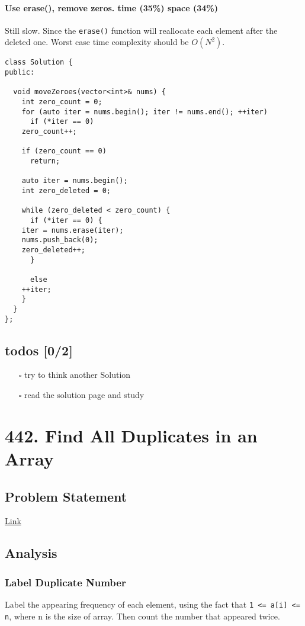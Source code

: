 \documentclass[12pt]{book}
\begin{document}
\subsubsection{Use erase(), remove zeros. time (35\%) space (34\%)}
\label{sec:orgc487c27}
Still slow. Since the \texttt{erase()} function will reallocate each element after the deleted one. Worst case time complexity should be \(O(N^2)\).
\begin{verbatim}
class Solution {
public:

  void moveZeroes(vector<int>& nums) {
    int zero_count = 0;
    for (auto iter = nums.begin(); iter != nums.end(); ++iter)
      if (*iter == 0)
	zero_count++;

    if (zero_count == 0)
      return;

    auto iter = nums.begin();
    int zero_deleted = 0;

    while (zero_deleted < zero_count) {
      if (*iter == 0) {
	iter = nums.erase(iter);
	nums.push_back(0);
	zero_deleted++;
      }

      else
	++iter;       
    }
  }
};
\end{verbatim}
\section{todos [0/2]}
\label{sec:orgc5e291a}
\begin{itemize}
\item[{$\square$}] try to think another Solution
\item[{$\square$}] read the solution page and study
\end{itemize}
\chapter{442. Find All Duplicates in an Array\label{orgb2f1edb}}
\label{sec:orgbff3927}
\section{Problem Statement}
\label{sec:orgc09cc6f}
\href{https://leetcode.com/problems/find-all-duplicates-in-an-array/}{Link}
\section{Analysis}
\label{sec:org9d294da}
\subsection{Label Duplicate Number}
\label{sec:org4b58791}
Label the appearing frequency of each element, using the fact that \texttt{1 <= a[i] <= n}, where n is the size of array. Then count the number that appeared twice.
\end{document}
